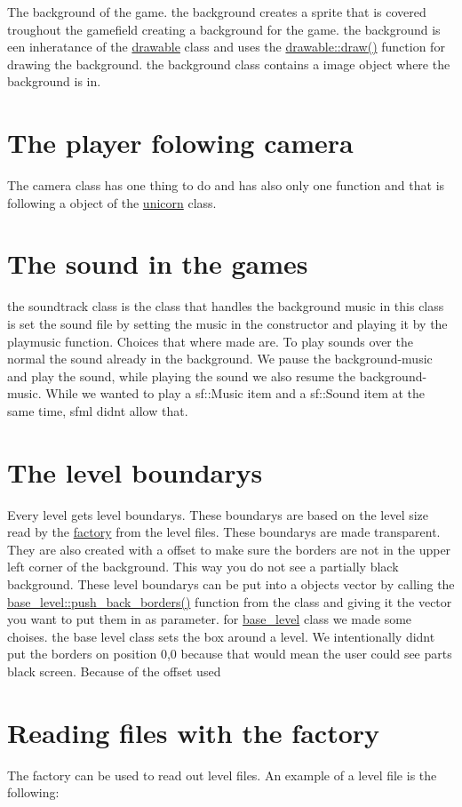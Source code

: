 The background of the game. the background creates a sprite that is covered troughout the gamefield creating a background for the game. the background is een inheratance of the \hyperlink{classdrawable}{drawable} class and uses the \hyperlink{classdrawable_a4e49e2c1121704c83ce24c5f48dd910f}{drawable\+::draw()} function for drawing the background. the background class contains a image object where the background is in.\hypertarget{index_camera}{}\section{The player folowing camera}\label{index_camera}
The camera class has one thing to do and has also only one function and that is following a object of the \hyperlink{classunicorn}{unicorn} class.\hypertarget{index_sound}{}\section{The sound in the games}\label{index_sound}
the soundtrack class is the class that handles the background music in this class is set the sound file by setting the music in the constructor and playing it by the playmusic function. Choices that where made are. To play sounds over the normal the sound already in the background. We pause the background-\/music and play the sound, while playing the sound we also resume the background-\/music. While we wanted to play a sf\+::\+Music item and a sf\+::\+Sound item at the same time, sfml didn\textquotesingle{}t allow that.\hypertarget{index_base_level}{}\section{The level boundary\textquotesingle{}s}\label{index_base_level}
Every level gets level boundary\textquotesingle{}s. These boundary\textquotesingle{}s are based on the level size read by the \hyperlink{classfactory}{factory} from the level files. These boundary\textquotesingle{}s are made transparent. They are also created with a offset to make sure the borders are not in the upper left corner of the background. This way you do not see a partially black background. These level boundary\textquotesingle{}s can be put into a objects vector by calling the \hyperlink{classbase__level_a3b2da28cf45cad434103e81ee6c4538d}{base\+\_\+level\+::push\+\_\+back\+\_\+borders()} function from the class and giving it the vector you want to put them in as parameter. for \hyperlink{classbase__level}{base\+\_\+level} class we made some choises. the base level class sets the box around a level. We intentionally didn\textquotesingle{}t put the borders on position 0,0 because that would mean the user could see parts black screen. Because of the offset used\hypertarget{index_factory}{}\section{Reading files with the factory}\label{index_factory}
The factory can be used to read out level files. An example of a level file is the following\+:

